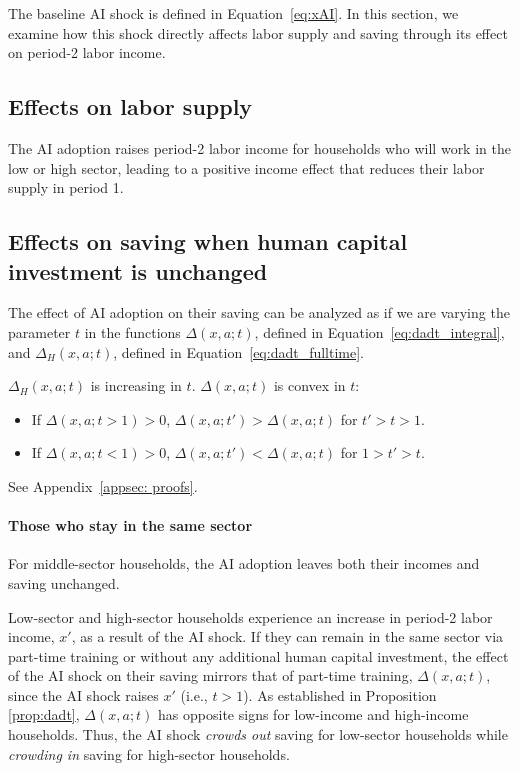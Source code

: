 \documentclass[12pt,english]{article}
\makeatletter
\numberwithin{equation}{section}
\renewenvironment{proof}[1][\proofname]{\par
    \pushQED{\qed}%
    \normalfont \topsep2\p@\@plus6\p@\relax
    \trivlist
    \item\relax
    {\itshape #1\@addpunct{.}}\hspace\labelsep\ignorespaces
}{%
    \popQED\endtrivlist\@endpefalse
}
\let\originaleqref\eqref
\renewcommand{\eqref}{Equation~\originaleqref}
\makeatother
\begin{document}
{The baseline AI shock is defined in \eqref{eq:xAI}. In this section, we examine how this shock directly affects labor supply and saving through its effect on period-2 labor income.

\subsection{Effects on labor supply} 

The AI adoption raises period-2 labor income for households who will work in the low or high sector, leading to a positive income effect that reduces their labor supply in period 1. 



\subsection{Effects on saving when human capital investment is unchanged}\label{appsec: AIeffects_saving}

The effect of AI adoption on their saving can be analyzed as if we are varying the parameter $t$ in the functions $\Delta(x,a;t)$, defined in \eqref{eq:dadt_integral}, and $\Delta_{H}(x,a;t)$, defined in \eqref{eq:dadt_fulltime}. 

\begin{proposition}\label{prop:Delta}
    $\Delta_{H}(x,a;t)$ is increasing in $t$. $\Delta(x,a;t)$ is convex in $t$:
    \begin{itemize}
        \item If $\Delta(x,a;t>1)>0$, $\Delta(x,a;t') > \Delta(x,a;t)$ for $t'>t>1$. 
        \item If $\Delta(x,a;t<1)>0$, $\Delta(x,a;t') < \Delta(x,a;t)$ for $1>t'>t$.
    \end{itemize}
\end{proposition}
\begin{proof}
    See Appendix~\ref{appsec: proofs}.
\end{proof}


\paragraph{Those who stay in the same sector}
For middle-sector households, the AI adoption leaves both their incomes and saving unchanged.

Low-sector and high-sector households experience an increase in period-2 labor income, $x'$, as a result of the AI shock. If they can remain in the same sector via part-time training or without any additional human capital investment, the effect of the AI shock on their saving mirrors that of part-time training, $\Delta(x,a;t)$, since the AI shock raises $x'$ (i.e., $t>1$). As established in Proposition \ref{prop:dadt}, $\Delta(x,a;t)$ has opposite signs for low-income and high-income households. Thus, the AI shock \textit{crowds out} saving for low-sector households while \textit{crowding in} saving for high-sector households.

}
\end{document}
